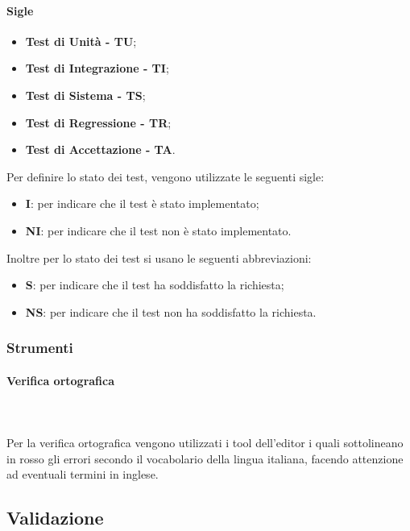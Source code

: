 		\paragraph{Sigle}
		\begin{itemize}
			\item \textbf{Test di Unità - TU};
			\item \textbf{Test di Integrazione - TI}; 
			\item \textbf{Test di Sistema - TS};
			\item \textbf{Test di Regressione - TR};
			\item \textbf{Test di Accettazione - TA}.	
		\end{itemize}
		Per definire lo stato dei test, vengono utilizzate le seguenti sigle:
		\begin{itemize}
			\item \textbf{I}: per indicare che il test è stato implementato;
			\item \textbf{NI}: per indicare che il test non è stato implementato.
		\end{itemize}
		Inoltre per lo stato dei test si usano le seguenti abbreviazioni:
		\begin{itemize}
			\item \textbf{S}: per indicare che il test ha soddisfatto la richiesta;
			\item \textbf{NS}: per indicare che il test non ha soddisfatto la richiesta.
		\end{itemize}
	\subsubsection{Strumenti}
		\paragraph{Verifica ortografica} \mbox{}\\ \mbox{}\\
		Per la verifica ortografica vengono utilizzati i tool dell'editor i quali sottolineano in rosso gli errori secondo il vocabolario della lingua italiana, facendo attenzione ad eventuali termini in inglese.
	
\subsection{Validazione}
